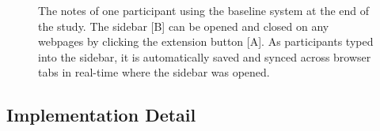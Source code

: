



\begin{figure}
    \centering
    \caption[One participant's project screenshot in the baseline variant of Weaver]{The notes of one participant using the baseline system at the end of the study. The sidebar [B] can be opened and closed on any webpages by clicking the extension button [A]. As participants typed into the sidebar, it is automatically saved and synced across browser tabs in real-time where the sidebar was opened.}
    \label{fig:baseline_fusion}
\end{figure}





\subsection{Implementation Detail}

